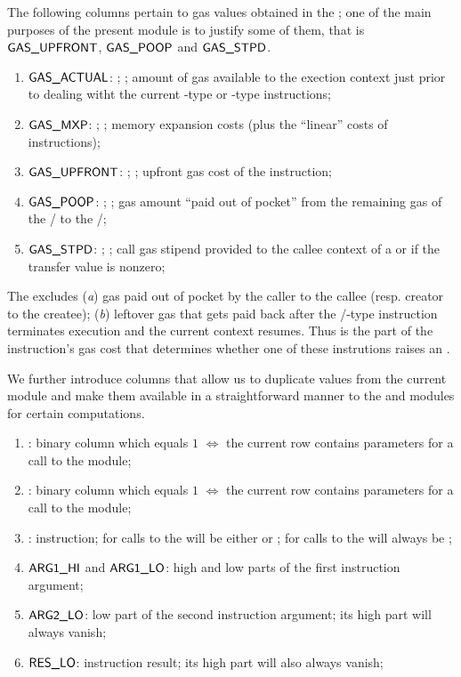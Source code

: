 The following columns pertain to gas values obtained in the \hubMod{};
one of the main purposes of the present module is to justify some of them, that is
$\textsf{GAS}\textsf{\_UPFRONT}$, $\textsf{GAS}\textsf{\_POOP}$ and $\textsf{GAS}\textsf{\_STPD}$.
\begin{enumerate}[resume]
	\item $\textsf{GAS}\textsf{\_ACTUAL}$: \godGiven{};
		\ccc{}; amount of gas available to the exection context just prior to dealing witht the current -type or -type instructions;
	\item $\textsf{GAS}\textsf{\_MXP}$: \godGiven{};
		\ccc{}; memory expansion costs (plus the ``linear'' costs of  instructions);
	\item $\textsf{GAS}\textsf{\_UPFRONT}$: \godGiven{};
		\ccc{}; upfront gas cost of the instruction;
	\item $\textsf{GAS}\textsf{\_POOP}$: \godGiven{};
		\ccc{}; gas amount ``paid out of pocket'' from the remaining gas of the \callerr{}/\creator{} to the \calleee{}/\createe{};	
	\item $\textsf{GAS}\textsf{\_STPD}$: \godGiven{};
		\ccc{}; call gas stipend provided to the callee context of a  or  if the transfer value is nonzero; 
\end{enumerate}
\saNote{}
The \gasUpfront{} excludes
(\emph{a}) gas paid out of pocket by the caller to the callee (resp. creator to the createe);
(\emph{b}) leftover gas that gets paid back after the /-type instruction terminates execution and the current context resumes.
Thus \gasUpfront{} is the part of the instruction's gas cost that determines whether one of these instrutions raises an \oogxSH{}.

We further introduce columns that allow us to duplicate values from the current module and make them available in a straightforward manner to the \wcpMod{} and \modMod{} modules for certain computations.
\begin{enumerate}[resume]
	\item \wcpLookupFlag{}:
		binary column which equals $1$ $\iff$ the current row contains parameters for a call to the \wcpMod{} module;
	\item \divLookupFlag{}:
		binary column which equals $1$ $\iff$ the current row contains parameters for a call to the \modMod{} module;
	\item \exoInst{}:
		instruction; for calls to the \wcpMod{} will be either  or ; for calls to the \modMod{} will always be ;
	\item $\textsf{ARG}\textsf{1}\textsf{\_HI}{}$ and $\textsf{ARG}\textsf{1}\textsf{\_LO}{}$:
		high and low parts of the first instruction argument;
	\item $\textsf{ARG}\textsf{2}\textsf{\_LO}{}$:
		low part of the second instruction argument; its high part will always vanish;
	\item $\textsf{RES}\textsf{\_LO}{}$:
		instruction result; its high part will also always vanish; 
\end{enumerate}
